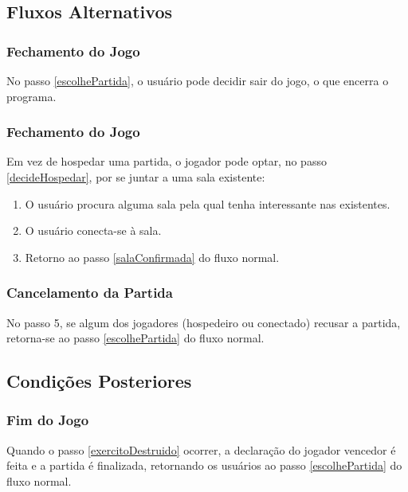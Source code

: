 \subsection{Fluxos Alternativos}

    \subsubsection{Fechamento do Jogo}
        No passo \ref{escolhePartida}, o usuário pode decidir sair do jogo, o que encerra o
        programa.

    \subsubsection{Fechamento do Jogo}
        Em vez de hospedar uma partida, o jogador pode optar, no passo \ref{decideHospedar},
        por se juntar a uma sala existente:
        \begin{enumerate}
            \item O usuário procura alguma sala pela qual tenha interessante nas existentes.
            \item O usuário conecta-se à sala.
            \item Retorno ao passo \ref{salaConfirmada} do fluxo normal.
        \end{enumerate}

    \subsubsection{Cancelamento da Partida}
        No passo 5, se algum dos jogadores (hospedeiro ou conectado) recusar
        a partida, retorna-se ao passo \ref{escolhePartida} do fluxo normal.


\subsection{Condições Posteriores}
    \subsubsection{Fim do Jogo}
        Quando o passo \ref{exercitoDestruido} ocorrer, a declaração do jogador vencedor é feita
        e a partida é finalizada, retornando os usuários ao passo \ref{escolhePartida}
        do fluxo normal.

